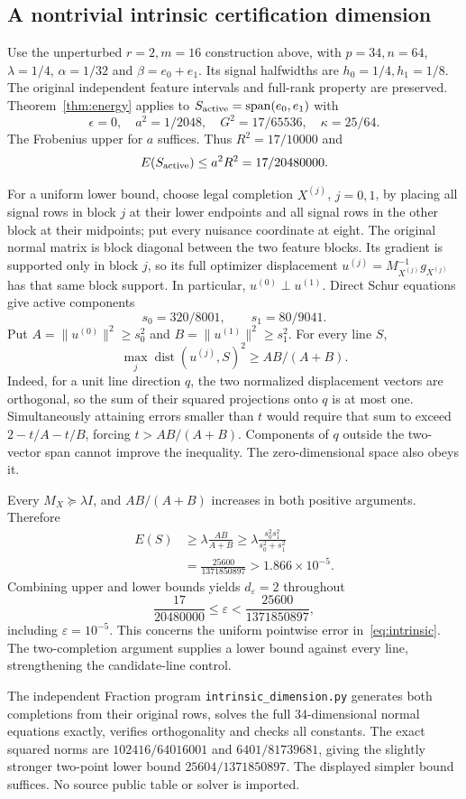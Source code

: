 \subsection{A nontrivial intrinsic certification dimension}\label{app:intrinsic-two-v83}
Use the unperturbed $r=2,m=16$ construction above, with $p=34,n=64$, $\lambda=1/4$, $\alpha=1/32$ and $\beta=e_0+e_1$. Its signal halfwidths are $h_0=1/4,h_1=1/8$. The original independent feature intervals and full-rank property are preserved. Theorem~\ref{thm:energy} applies to $S_{\rm active}=\operatorname{span}(e_0,e_1)$ with
\[
 \epsilon=0,\quad a^2=1/2048,\quad
 G^2=17/65536,\quad\kappa=25/64.
\]
The Frobenius upper for $a$ suffices. Thus $R^2=17/10000$ and
\[
 E(S_{\rm active})\le a^2R^2=17/20480000.
\]

For a uniform lower bound, choose legal completion $X^{(j)}$, $j=0,1$, by placing all signal rows in block $j$ at their lower endpoints and all signal rows in the other block at their midpoints; put every nuisance coordinate at eight. The original normal matrix is block diagonal between the two feature blocks. Its gradient is supported only in block $j$, so its full optimizer displacement $u^{(j)}=M_{X^{(j)}}^{-1}g_{X^{(j)}}$ has that same block support. In particular, $u^{(0)}\perp u^{(1)}$. Direct Schur equations give active components
\[
 s_0=320/8001,\qquad s_1=80/9041.
\]
Put $A=\|u^{(0)}\|^2\ge s_0^2$ and $B=\|u^{(1)}\|^2\ge s_1^2$. For every line $S$,
\[
 \max_j\operatorname{dist}(u^{(j)},S)^2\ge AB/(A+B).
\]
Indeed, for a unit line direction $q$, the two normalized displacement vectors are orthogonal, so the sum of their squared projections onto $q$ is at most one. Simultaneously attaining errors smaller than $t$ would require that sum to exceed $2-t/A-t/B$, forcing $t>AB/(A+B)$. Components of $q$ outside the two-vector span cannot improve the inequality. The zero-dimensional space also obeys it.

Every $M_X\succeq\lambda I$, and $AB/(A+B)$ increases in both positive arguments. Therefore
\begin{align*}
 E(S)&\ge\lambda\frac{AB}{A+B}
 \ge\lambda\frac{s_0^2s_1^2}{s_0^2+s_1^2}\\
 &=\frac{25600}{1371850897}>1.866\times10^{-5}.
\end{align*}
Combining upper and lower bounds yields $d_\varepsilon=2$ throughout
\[
 \frac{17}{20480000}\le\varepsilon<\frac{25600}{1371850897},
\]
including $\varepsilon=10^{-5}$. This concerns the uniform pointwise error in~\eqref{eq:intrinsic}. The two-completion argument supplies a lower bound against every line, strengthening the candidate-line control.

The independent Fraction program \texttt{intrinsic\_dimension.py} generates both completions from their original rows, solves the full 34-dimensional normal equations exactly, verifies orthogonality and checks all constants. The exact squared norms are $102416/64016001$ and $6401/81739681$, giving the slightly stronger two-point lower bound $25604/1371850897$. The displayed simpler bound suffices. No source public table or solver is imported.
